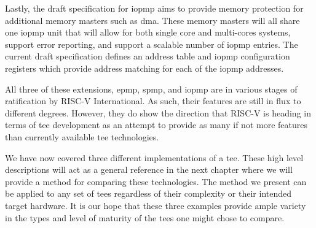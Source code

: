Lastly, the draft specification for \gls{iopmp} aims to provide memory protection for additional memory masters such as \gls{dma}. These memory masters will all share one \gls{iopmp} unit that will allow for both single core and multi-cores systems, support error reporting, and support a scalable number of \gls{iopmp} entries. The current draft specification defines an address table and \gls{iopmp} configuration registers which provide address matching for each of the \gls{iopmp} addresses.

All three of these extensions, \gls{epmp}, \gls{spmp}, and \gls{iopmp} are in various stages of ratification by RISC-V International. As such, their features are still in flux to different degrees. However, they do show the direction that RISC-V is heading in terms of \gls{tee} development as an attempt to provide as many if not more features than currently available \gls{tee} technologies.

We have now covered three different implementations of a \gls{tee}. These high level descriptions will act as a general reference in the next chapter where we will provide a method for comparing these technologies. The method we present can be applied to any set of \glspl{tee} regardless of their complexity or their intended target hardware. It is our hope that these three examples provide ample variety in the types and level of maturity of the \glspl{tee} one might chose to compare.

